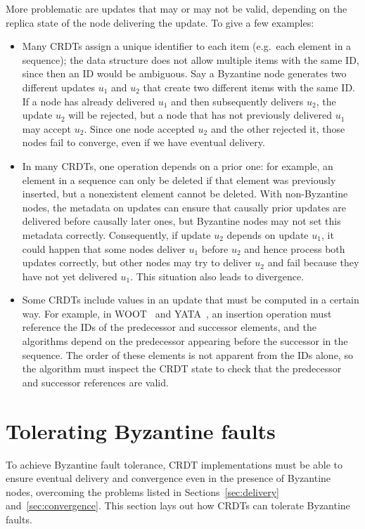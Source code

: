 \documentclass[sigplan,review]{acmart}
\begin{document}
More problematic are updates that may or may not be valid, depending on the replica state of the node delivering the update.
To give a few examples:
\begin{itemize}
\item Many CRDTs assign a unique identifier to each item (e.g.\ each element in a sequence); the data structure does not allow multiple items with the same ID, since then an ID would be ambiguous.
Say a Byzantine node generates two different updates $u_1$ and $u_2$ that create two different items with the same ID.
If a node has already delivered $u_1$ and then subsequently delivers $u_2$, the update $u_2$ will be rejected, but a node that has not previously delivered $u_1$ may accept $u_2$.
Since one node accepted $u_2$ and the other rejected it, those nodes fail to converge, even if we have eventual delivery.

\item In many CRDTs, one operation depends on a prior one: for example, an element in a sequence can only be deleted if that element was previously inserted, but a nonexistent element cannot be deleted.
With non-Byzantine nodes, the metadata on updates can ensure that causally prior updates are delivered before causally later ones, but Byzantine nodes may not set this metadata correctly.
Consequently, if update $u_2$ depends on update $u_1$, it could happen that some nodes deliver $u_1$ before $u_2$ and hence process both updates correctly, but other nodes may try to deliver $u_2$ and fail because they have not yet delivered $u_1$.
This situation also leads to divergence.

\item Some CRDTs include values in an update that must be computed in a certain way.
For example, in WOOT~\cite{Oster:2006} and YATA~\cite{Nicolaescu:2016}, an insertion operation must reference the IDs of the predecessor and successor elements, and the algorithms depend on the predecessor appearing before the successor in the sequence.
The order of these elements is not apparent from the IDs alone, so the algorithm must inspect the CRDT state to check that the predecessor and successor references are valid.
\end{itemize}

\section{Tolerating Byzantine faults}\label{sec:solution}

To achieve Byzantine fault tolerance, CRDT implementations must be able to ensure eventual delivery and convergence even in the presence of Byzantine nodes, overcoming the problems listed in Sections~\ref{sec:delivery} and~\ref{sec:convergence}.
This section lays out how CRDTs can tolerate Byzantine faults.
\end{document}

